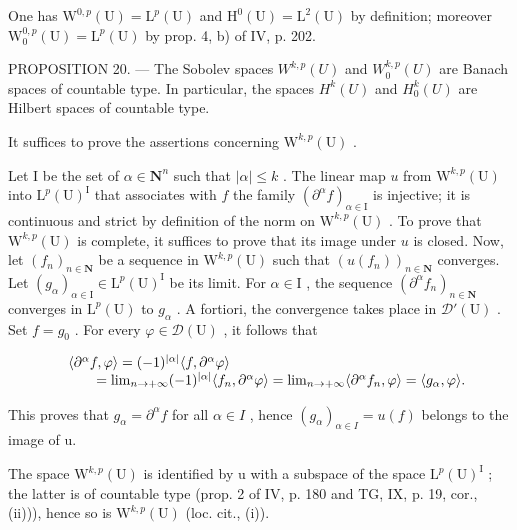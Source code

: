 One has \(\mathrm{W}^{0,p}(\mathrm{U})=\mathrm{L}^{p}(\mathrm{U})\) and \(\mathrm{H}^{0}(\mathrm{U})=\mathrm{L}^{2}(\mathrm{U})\) by definition; moreover \(\mathrm{W}_{0}^{0,p}(\mathrm{U})=\mathrm{L}^{p}(\mathrm{U})\) by prop. 4, b) of IV, p. 202.

PROPOSITION 20. — The Sobolev spaces \(W^{k,p}(U)\) and \(W_{0}^{k,p}(U)\) are Banach spaces of countable type. In particular, the spaces \(H^{k}(U)\) and \(H_{0}^{k}(U)\) are Hilbert spaces of countable type.

It suffices to prove the assertions concerning \(\mathrm{W}^{k,p}(\mathrm{U})\) .

Let I be the set of \(\alpha \in \mathbf{N}^n\) such that \(|\alpha| \leqslant k\) . The linear map \(u\) from \(\mathrm{W}^{k,p}(\mathrm{U})\) into \(\mathrm{L}^p (\mathrm{U})^{\mathrm{I}}\) that associates with \(f\) the family \((\partial^{\alpha}f)_{\alpha \in \mathrm{I}}\) is injective; it is continuous and strict by definition of the norm on \(\mathrm{W}^{k,p}(\mathrm{U})\) . To prove that \(\mathrm{W}^{k,p}(\mathrm{U})\) is complete, it suffices to prove that its image under \(u\) is closed. Now, let \((f_n)_{n \in \mathbf{N}}\) be a sequence in \(\mathrm{W}^{k,p}(\mathrm{U})\) such that \((u(f_n))_{n \in \mathbf{N}}\) converges. Let \((g_{\alpha})_{\alpha \in \mathrm{I}} \in \mathrm{L}^p (\mathrm{U})^{\mathrm{I}}\) be its limit. For \(\alpha \in \mathrm{I}\) , the sequence \((\partial^{\alpha}f_n)_{n \in \mathbf{N}}\) converges in \(\mathrm{L}^p (\mathrm{U})\) to \(g_{\alpha}\) . A fortiori, the convergence takes place in \(\mathcal{D}'(\mathrm{U})\) . Set \(f = g_0\) . For every \(\varphi \in \mathcal{D}(\mathrm{U})\) , it follows that

\[
\begin{array}{r l} & {\langle \partial^ {\alpha} f, \varphi \rangle = (- 1) ^ {| \alpha |} \langle f, \partial^ {\alpha} \varphi \rangle} \\ & {\qquad = \lim _ {n \to + \infty} (- 1) ^ {| \alpha |} \langle f _ {n}, \partial^ {\alpha} \varphi \rangle = \lim _ {n \to + \infty} \langle \partial^ {\alpha} f _ {n}, \varphi \rangle = \langle g _ {\alpha}, \varphi \rangle .} \end{array}
\]

This proves that \(g_{\alpha} = \partial^{\alpha} f\) for all \(\alpha \in I\) , hence \((g_{\alpha})_{\alpha \in I} = u(f)\) belongs to the image of u.

The space \(\mathrm{W}^{k,p}(\mathrm{U})\) is identified by u with a subspace of the space \(\mathrm{L}^{p}(\mathrm{U})^{\mathrm{I}}\) ; the latter is of countable type (prop. 2 of IV, p. 180 and TG, IX, p. 19, cor., (ii))), hence so is \(\mathrm{W}^{k,p}(\mathrm{U})\) (loc. cit., (i)).

